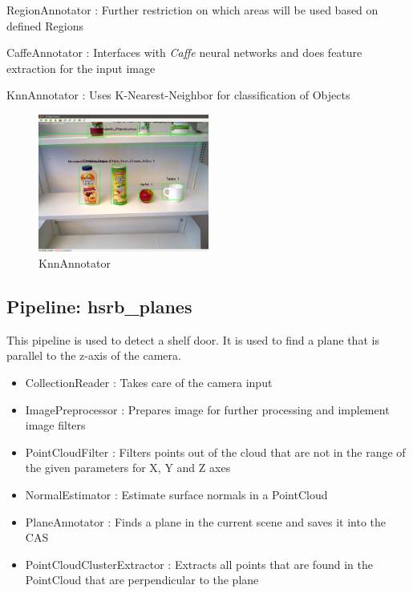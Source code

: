 \documentclass[main.tex]{subfiles}
\begin{document}
\begin{itemize}
	\item RegionAnnotator : Further restriction on which areas will be used based on defined Regions 
	\item CaffeAnnotator : Interfaces with \textit{Caffe} neural networks and does feature extraction for the input image

	\begin{minipage}[t]{\textwidth}
	\item KnnAnnotator : Uses K-Nearest-Neighbor for classification of Objects 
		\begin{figure}[H]
   			 \centering
    			 \includegraphics[width=0.5\textwidth]{pictures/2d/KnnAnnotator.png}
   			 \caption{KnnAnnotator}
  		\end{figure}
	\end{minipage}
\end{itemize}



			\subsection{Pipeline: hsrb\_planes} 
This pipeline is used to detect a shelf door. It is used to find a plane that is parallel to the z-axis of the camera.
\begin{itemize}
	\item CollectionReader : Takes care of the camera input
	\item ImagePreprocessor : Prepares image for further processing and implement image filters  
	\item PointCloudFilter : Filters points out of the cloud that are not in the range of the given parameters for X, Y and Z axes
	\item NormalEstimator : Estimate surface normals in a PointCloud 
	\item PlaneAnnotator : Finds a plane in the current scene and saves it into the CAS
	\item PointCloudClusterExtractor : Extracts all points that are found in the PointCloud that are perpendicular to the plane 
\end{itemize}
\end{document}
